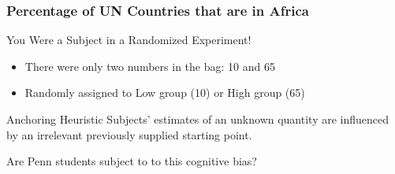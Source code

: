 \begin{frame}
\frametitle{Percentage of UN Countries that are in Africa}
\begin{block}{You Were a Subject in a Randomized Experiment!}
	\begin{itemize}
		\item There were only two numbers in the bag: 10 and 65
		\item Randomly assigned to Low group (10) or High group (65)
	\end{itemize}
	\end{block} \pause
\begin{block}{Anchoring Heuristic \href{http://www.jstor.org/stable/1738360}{}}
	Subjects' estimates of an unknown quantity are influenced by an irrelevant previously supplied starting point.
\end{block}
\begin{alertblock}{Are Penn students subject to to this cognitive bias?}
\end{alertblock}
\end{frame}
%
